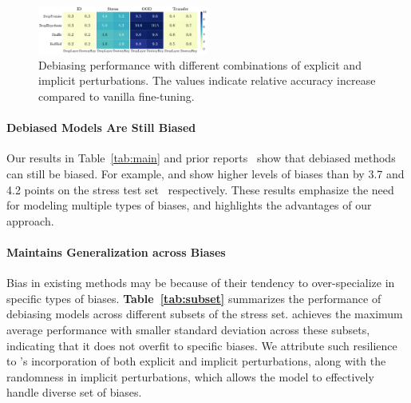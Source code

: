 \begin{figure}[t]
    \centering
    \vspace{-10pt}
    \includegraphics[width=0.5\textwidth]{figure/two_aug.pdf}
    \vspace{-20pt}    
    \caption{Debiasing performance with different combinations of explicit and implicit perturbations. 
    The values indicate relative accuracy %
    increase compared to vanilla fine-tuning.}
    \label{fig:two_aug}
\end{figure}





\paragraph{Debiased Models Are Still Biased}
Our results in Table~\ref{tab:main} and prior reports~\citep{mendelson-belinkov-2021-debiasing,ravichander-etal-2023-bias} show that debiased methods can still be biased. For example, \MASK and \KW show higher levels of biases than \FT
by 3.7 and 4.2 points on the stress test set~\citep{naik-etal-2018-stress} respectively. These results emphasize the need for modeling multiple types of biases, and highlights the advantages of our approach.

\paragraph{\OursCL Maintains Generalization across Biases}
Bias in existing methods may be because of their tendency to over-specialize in specific types of biases. \textbf{Table~\ref{tab:subset}} summarizes the performance of debiasing models across different subsets of the stress set. \OursCL achieves the maximum average performance with smaller standard deviation across these subsets, indicating that it does not overfit to specific biases. We attribute such resilience to \OursCL's incorporation of both explicit and implicit perturbations, along with the randomness in implicit perturbations, which allows the model to effectively handle diverse set of biases.

